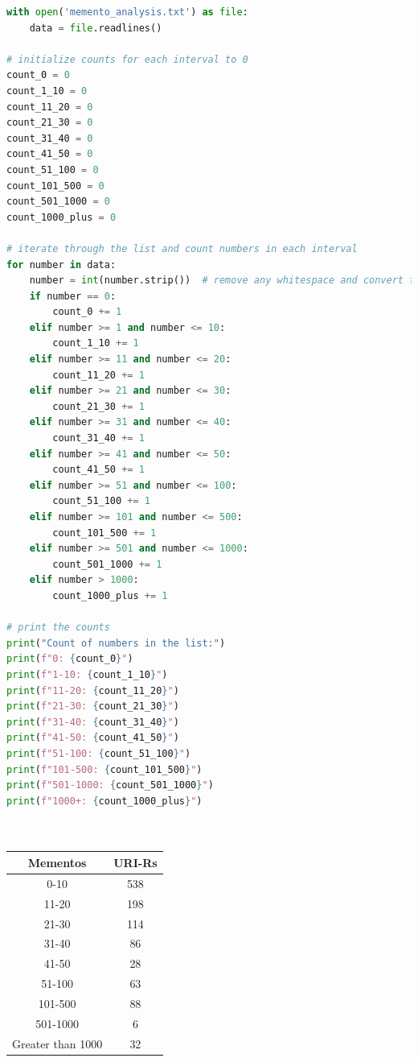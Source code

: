 \documentclass[12pt]{article}
\begin{document}
\begin{lstlisting}[language=Python, caption=Calculate the mementos by number, label=lst:copy]
with open('memento_analysis.txt') as file:
    data = file.readlines()

# initialize counts for each interval to 0
count_0 = 0
count_1_10 = 0
count_11_20 = 0
count_21_30 = 0
count_31_40 = 0
count_41_50 = 0
count_51_100 = 0
count_101_500 = 0
count_501_1000 = 0
count_1000_plus = 0

# iterate through the list and count numbers in each interval
for number in data:
    number = int(number.strip())  # remove any whitespace and convert to integer
    if number == 0:
        count_0 += 1
    elif number >= 1 and number <= 10:
        count_1_10 += 1
    elif number >= 11 and number <= 20:
        count_11_20 += 1
    elif number >= 21 and number <= 30:
        count_21_30 += 1
    elif number >= 31 and number <= 40:
        count_31_40 += 1
    elif number >= 41 and number <= 50:
        count_41_50 += 1
    elif number >= 51 and number <= 100:
        count_51_100 += 1
    elif number >= 101 and number <= 500:
        count_101_500 += 1
    elif number >= 501 and number <= 1000:
        count_501_1000 += 1
    elif number > 1000:
        count_1000_plus += 1

# print the counts
print("Count of numbers in the list:")
print(f"0: {count_0}")
print(f"1-10: {count_1_10}")
print(f"11-20: {count_11_20}")
print(f"21-30: {count_21_30}")
print(f"31-40: {count_31_40}")
print(f"41-50: {count_41_50}")
print(f"51-100: {count_51_100}")
print(f"101-500: {count_101_500}")
print(f"501-1000: {count_501_1000}")
print(f"1000+: {count_1000_plus}")

        
\end{lstlisting}

\begin{center}
\begin{tabular}{||c c ||} 
 \hline
 Mementos & URI-Rs \\ [0.5ex] 
 \hline\hline
 0-10 & 538  \\ 
 \hline
 11-20 & 198 \\
 \hline
 21-30 & 114  \\
 \hline
 31-40 & 86  \\
  \hline
 41-50 & 28 \\
 \hline
 51-100 & 63  \\
 \hline
 101-500 & 88  \\
 \hline
 501-1000 & 6 \\
 \hline
 Greater than 1000 & 32 \\ [1ex] 
 \hline
\end{tabular}
\end{center}
\end{document}
